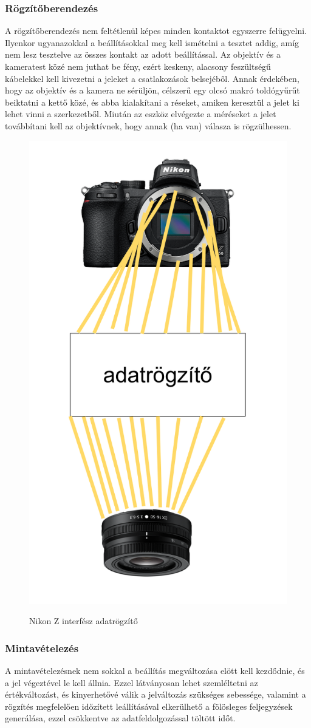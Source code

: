 \subsubsection{Rögzítőberendezés}
A rögzítőberendezés nem feltétlenül képes minden kontaktot egyszerre felügyelni. Ilyenkor ugyanazokkal a beállításokkal meg kell ismételni a tesztet addig, amíg nem lesz tesztelve az összes kontakt az adott beállítással. Az objektív és a kameratest közé nem juthat be fény, ezért keskeny, alacsony feszültségű kábelekkel kell kivezetni a jeleket a csatlakozások belsejéből. Annak érdekében, hogy az objektív és a kamera ne sérüljön, célszerű egy olcsó makró toldógyűrűt beiktatni a kettő közé, és abba kialakítani a réseket, amiken keresztül a jelet ki lehet vinni a szerkezetből. Miután az eszköz elvégezte a méréseket a jelet továbbítani kell az objektívnek, hogy annak (ha van) válasza is rögzülhessen.
\begin{figure}[H]
	\centering
	\includegraphics[width=0.5\linewidth]{img/arduino.drawio.png}
    \cite{Nikon_Z}\cite{Nikon_Z_16-50}
	\caption{Nikon Z interfész adatrögzítő}
	\label{fig:rogzito}
\end{figure}
\subsubsection{Mintavételezés}
A mintavételezésnek nem sokkal a beállítás megváltozása elött kell kezdődnie, és a jel végeztével le kell állnia. Ezzel látványosan lehet szemléltetni az értékváltozást, és kinyerhetővé válik a jelváltozás szükséges sebessége, valamint a rögzítés megfelelően időzített leállításával elkerülhető a fölösleges feljegyzések generálása, ezzel csökkentve az adatfeldolgozással töltött időt.
